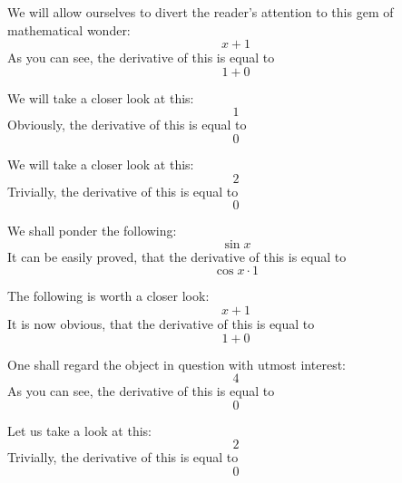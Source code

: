 \documentclass{article}
\begin{document}
We will allow ourselves to divert the reader's attention to this gem of mathematical wonder:
\begin{equation}
x + 1 
\end{equation}
As you can see, the derivative of this is equal to
\begin{equation}
1 + 0 
\end{equation}

We will take a closer look at this:
\begin{equation}
1 
\end{equation}
Obviously, the derivative of this is equal to
\begin{equation}
0 
\end{equation}

We will take a closer look at this:
\begin{equation}
2 
\end{equation}
Trivially, the derivative of this is equal to
\begin{equation}
0 
\end{equation}

We shall ponder the following:
\begin{equation}
\sin x 
\end{equation}
It can be easily proved, that the derivative of this is equal to
\begin{equation}
\cos x \cdot 1 
\end{equation}

The following is worth a closer look:
\begin{equation}
x + 1 
\end{equation}
It is now obvious, that the derivative of this is equal to
\begin{equation}
1 + 0 
\end{equation}

One shall regard the object in question with utmost interest:
\begin{equation}
4 
\end{equation}
As you can see, the derivative of this is equal to
\begin{equation}
0 
\end{equation}

Let us take a look at this:
\begin{equation}
2 
\end{equation}
Trivially, the derivative of this is equal to
\begin{equation}
0 
\end{equation}
\end{document}
